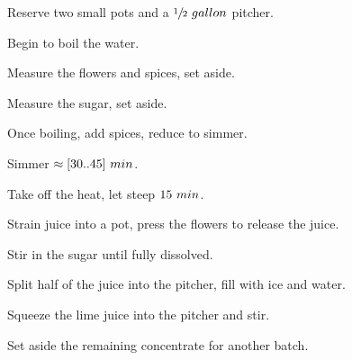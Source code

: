 \begin{preparation}
\item Reserve two small pots and a $\onehalf~\gallon$ pitcher.
\item Begin to boil the water.
\item Measure the flowers and spices, set aside.
\item Measure the sugar, set aside.
\item Once boiling, add spices, reduce to simmer.
\item Simmer $\approx[30..45]~\minute$.
\item Take off the heat, let steep $15~\minute$.
\item Strain juice into a pot, press the flowers to release the juice.
\item Stir in the sugar until fully dissolved.
\item Split half of the juice into the pitcher, fill with ice and water.
\item Squeeze the lime juice into the pitcher and stir.
\item Set aside the remaining concentrate for another batch.
\end{preparation}

\recipeend%
